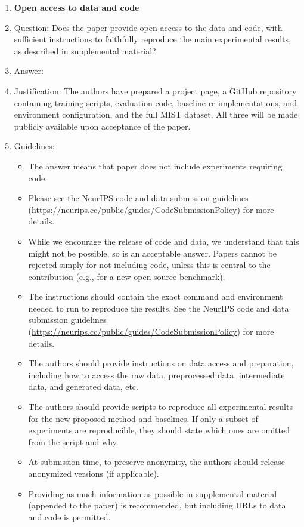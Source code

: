 \begin{enumerate}
\item {\bf Open access to data and code}
    \item[] Question: Does the paper provide open access to the data and code, with sufficient instructions to faithfully reproduce the main experimental results, as described in supplemental material?
    \item[] Answer: \answerYes{}
    \item[] Justification: The authors have prepared a project page, a GitHub repository containing training scripts, evaluation code, baseline re-implementations, and environment configuration, and the full MIST dataset. All three will be made publicly available upon acceptance of the paper.
    \item[] Guidelines:
    \begin{itemize}
        \item The answer \answerNA{} means that paper does not include experiments requiring code.
        \item Please see the NeurIPS code and data submission guidelines (\url{https://neurips.cc/public/guides/CodeSubmissionPolicy}) for more details.
        \item While we encourage the release of code and data, we understand that this might not be possible, so \answerNo{} is an acceptable answer. Papers cannot be rejected simply for not including code, unless this is central to the contribution (e.g., for a new open-source benchmark).
        \item The instructions should contain the exact command and environment needed to run to reproduce the results. See the NeurIPS code and data submission guidelines (\url{https://neurips.cc/public/guides/CodeSubmissionPolicy}) for more details.
        \item The authors should provide instructions on data access and preparation, including how to access the raw data, preprocessed data, intermediate data, and generated data, etc.
        \item The authors should provide scripts to reproduce all experimental results for the new proposed method and baselines. If only a subset of experiments are reproducible, they should state which ones are omitted from the script and why.
        \item At submission time, to preserve anonymity, the authors should release anonymized versions (if applicable).
        \item Providing as much information as possible in supplemental material (appended to the paper) is recommended, but including URLs to data and code is permitted.
    \end{itemize}



\end{enumerate}

